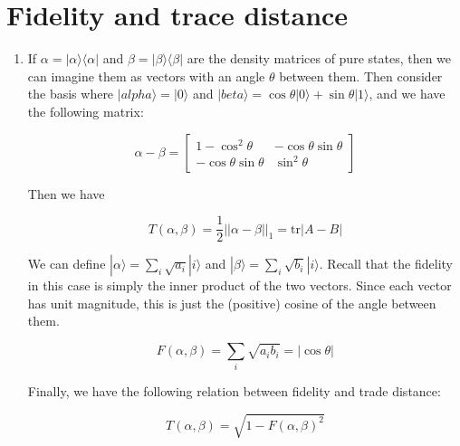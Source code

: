 \documentclass[12pt]{article}
\begin{document}
\newcommand{\ket}[1]{|#1 \rangle}
\newcommand{\bra}[1]{\langle #1 |}
\newcommand{\tr}{\text{tr}}
\newcommand{\normtwo}{\frac{1}{\sqrt{2}}}

\setcounter{section}{0}
\section{Fidelity and trace distance}

\begin{enumerate}

\item
If $\alpha = \ket{\alpha}\bra{\alpha}$ and
$\beta = \ket{\beta}\bra{\beta}$ are the density matrices of pure states,
then we can imagine them as vectors with an angle $\theta$ between them.
Then consider the basis where $\ket{alpha} = \ket{0}$ and
$\ket{beta} = \cos\theta\ket{0} + \sin\theta\ket{1}$, and we have the
following matrix:

\begin{displaymath}
\alpha - \beta = 
\begin{bmatrix}
1 - \cos^2 \theta      & -\cos\theta \sin\theta \\
-\cos\theta \sin\theta & \sin^2 \theta
\end{bmatrix}
\end{displaymath}

Then we have

\begin{displaymath}
T(\alpha, \beta) = \frac{1}{2}||\alpha - \beta||_1 = \tr |A-B|

\end{displaymath}

We can define $\ket{\alpha} = \sum_{i} \sqrt{a_i}\ket{i}$ and
$\ket{\beta} = \sum_{i} \sqrt{b_i}\ket{i}$.
Recall that the fidelity in this case is simply the inner product of
the two vectors. Since each vector has unit magnitude, this is just the
(positive) cosine of the angle between them.

\begin{displaymath}
F(\alpha,\beta) = \sum_{i} \sqrt{a_i b_i} = |\cos\theta|
\end{displaymath}

Finally, we have the following relation between fidelity and trade distance:

\begin{displaymath}
T(\alpha, \beta) = \sqrt{1 - F(\alpha,\beta)^2}
\end{displaymath}


\end{enumerate}
\end{document}
